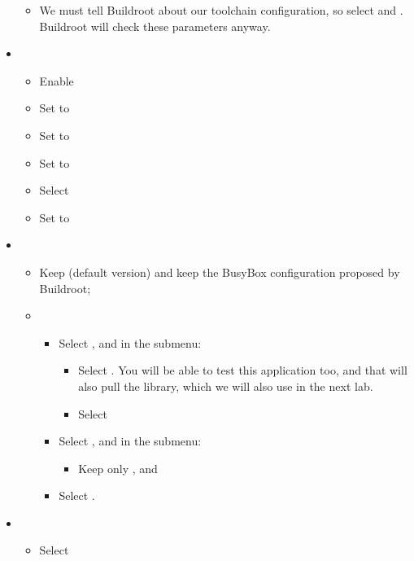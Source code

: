 \begin{itemize}
\begin{itemize}
  \item We must tell Buildroot about our toolchain configuration, so
    select  and
    .
    Buildroot will check these parameters anyway.
  \end{itemize}
\item {}
  \begin{itemize}
  \item Enable 
  \item Set  to 
  \item Set  to 
  \item Set  to 
  \item Select 
  \item Set  to 
\end{itemize}
\item {}
  \begin{itemize}
  \item Keep  (default version) and keep the BusyBox
    configuration proposed by Buildroot;
  \item {}
    \begin{itemize}
    \item Select , and in the submenu:
    \begin{itemize}
         \item Select . You will be able to
	       test this application too, and that will also pull
	       the  library, which we will also use
	       in the next lab.
         \item Select 
    \end{itemize}
    \item Select , and in the submenu:
    \begin{itemize}
         \item Keep only ,  and 
    \end{itemize}
    \item Select .
    \end{itemize}
  \end{itemize}
\item {}
  \begin{itemize}
  \item Select 
  \end{itemize}
\end{itemize}

